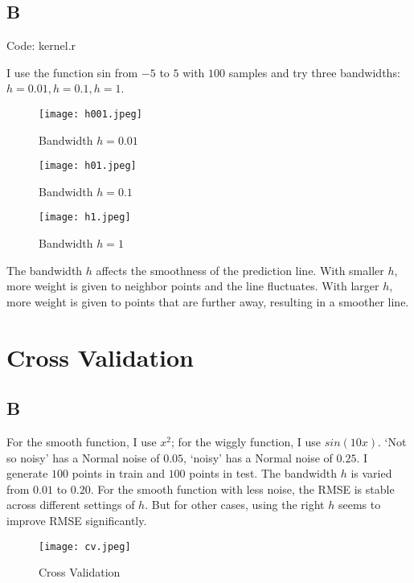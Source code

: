 \documentclass{article}
\begin{document}
\subsection*{B}
Code: kernel.r

\noindent
I use the function \textsf{sin} from $-5$ to $5$ with $100$ samples and try three bandwidths: \(h = 0.01, h = 0.1, h = 1\).

\begin{figure}[h!]
\texttt{[image: h001.jpeg]}
\caption{Bandwidth \(h = 0.01\)}
\end{figure}

\begin{figure}[h!]
\texttt{[image: h01.jpeg]}
\caption{Bandwidth \(h = 0.1\)}
\end{figure}


\begin{figure}[h!]
\texttt{[image: h1.jpeg]}
\caption{Bandwidth \(h = 1\)}
\end{figure}




The bandwidth \(h\) affects the smoothness of the prediction line. With smaller \(h\), more weight is given to neighbor points and the line fluctuates. With larger \(h\), more weight is given to points that are further away, resulting in a smoother line.

\section*{Cross Validation}
\subsection*{B}
For the smooth function, I use \(x^2\); for the wiggly function, I use \(sin(10x)\). `Not so noisy' has a Normal noise of \(0.05\), `noisy' has a Normal noise of \(0.25\). I generate \(100\) points in train and \(100\) points in test. The bandwidth \(h\) is varied from \(0.01\) to \(0.20\). For the smooth function with less noise, the RMSE is stable across different settings of \(h\). But for other cases, using the right \(h\) seems to improve RMSE significantly.
\begin{figure}[h!]
\texttt{[image: cv.jpeg]}
\caption{Cross Validation}
\end{figure}
\end{document}
